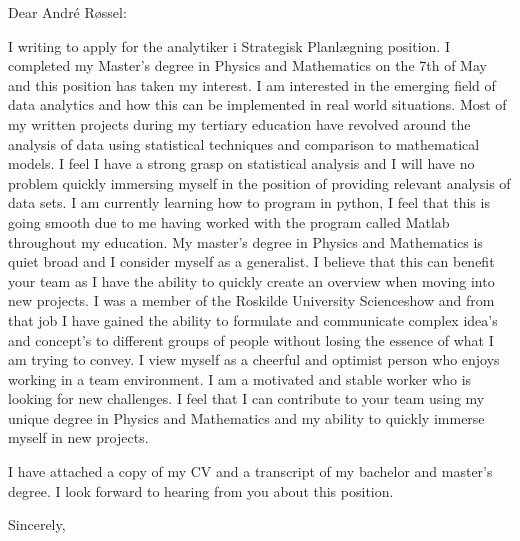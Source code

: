 \documentclass[10pt,a4paper]{letter}
\begin{document}
\begin{letter}{}
\opening{Dear André Røssel:}

I writing to apply for the analytiker i Strategisk Planlægning position. I completed my Master's degree in Physics and Mathematics on the 7th of May and this position has taken my interest. I am interested in the emerging field of data analytics and how this can be implemented in real world situations. Most of my written projects during my tertiary education have revolved around the analysis of data using statistical techniques and comparison to mathematical models. I feel I have a strong grasp on statistical analysis and I will have no problem quickly immersing myself in the position of providing relevant analysis of data sets. I am currently learning how to program in python, I feel that this is going smooth due to me having worked with the program called Matlab throughout my education. My master's degree in Physics and Mathematics is quiet broad and I consider myself as a generalist. I believe that this can benefit your team as I have the ability to quickly create an overview when moving into new projects. I was a member of the Roskilde University Scienceshow and from that job I have gained the ability to formulate and communicate complex idea's and concept's to different groups of people without losing the essence of what I am trying to convey.  I view myself as a cheerful and optimist person who enjoys working in a team environment. I am a motivated and stable worker who is looking for new challenges. I feel that I can contribute to your team using my unique degree in Physics and Mathematics and my ability to quickly immerse myself in new projects. 

I have attached a copy of my CV and a transcript of my bachelor and master's degree. I look forward to hearing from you about this position.   

\closing{Sincerely,}

\end{letter}

\end{document}
